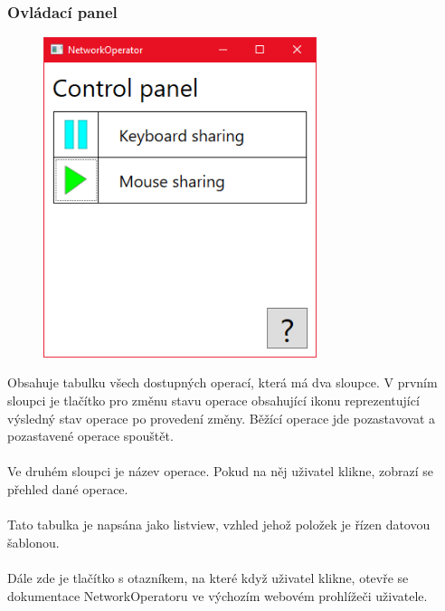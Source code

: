 \documentclass[12pt]{article}
\begin{document}
\subsubsection{Ovládací panel}
\begin{figure}[H]
\includegraphics[width=8cm]{control-panel.png}
\centering
\end{figure}

Obsahuje tabulku všech dostupných operací, která má dva sloupce. V prvním sloupci je tlačítko pro změnu stavu operace obsahující ikonu reprezentující výsledný stav operace po provedení změny. Běžící operace jde pozastavovat a pozastavené operace spouštět.\\\\
Ve druhém sloupci je název operace. Pokud na něj uživatel klikne, zobrazí se přehled dané operace.\\\\
Tato tabulka je napsána jako listview, vzhled jehož položek je řízen datovou šablonou.\\\\
Dále zde je tlačítko s otazníkem, na které když uživatel klikne, otevře se dokumentace NetworkOperatoru ve výchozím webovém prohlížeči uživatele.
\end{document}
